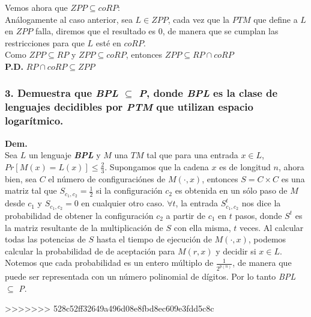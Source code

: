 \documentclass[12pt]{article}
\begin{document}
Vemos ahora que $ZPP \subseteq coRP$: \\
Análogamente al caso anterior, sea $L \in ZPP$, cada vez que la $PTM$ que define a $L$ en $ZPP$ falla, diremos que el resultado es 0, de manera que se cumplan las restricciones para que $L$ esté en $coRP$. \\

Como $ZPP \subseteq RP$ y $ZPP \subseteq coRP$, entonces $ZPP \subseteq RP \cap coRP$ \\

\fbox{\textbf{$\supseteq$}} \textbf{P.D.} $RP \cap coRP \subseteq ZPP$ \\



\subsubsection*{3. Demuestra que \textit{BPL} $\subseteq$ \textit{P}, donde \textit{BPL} es la clase de lenguajes decidibles por \textit{PTM} que utilizan espacio logarítmico.}
\textbf{Dem.}\\
Sea $L$ un lenguaje \textbf{\textit{BPL}} y $M$ una $TM$ tal que para una entrada $x \in L$, $Pr[M(x) = L(x)] \leq \frac{2}{3}$. Supongamos que la cadena $x$ es de longitud $n$, ahora bien, sea $C$ el número de configuraciónes de $M(\cdot,x)$, entonces $S = C \times C$ es una matriz tal que $S_{{c_1},{c_2}} = \frac{1}{2}$ si la configuración $c_2$ es obtenida en un sólo paso de $M$ desde $c_1$ y  $S_{{c_1},{c_2}} = 0$ en cualquier otro caso. $\forall t$, la entrada $S^t_{{c_1},{c_2}}$ nos dice la probabilidad de obtener
la configuración $c_2$ a partir de $c_1$ en $t$ pasos, donde $S^t$ es la matriz resultante de la multiplicación de $S$ con ella misma, $t$ veces. Al calcular todas las potencias de $S$ hasta el tiempo de ejecución de $M(\cdot,x)$, podemos calcular la probabilidad de de aceptación para $M(r,x)$ y decidir si $x \in L$. Notemos que cada probabilidad es un entero múltiplo de $\frac{1}{2^{p(n)}}$, de manera que puede ser representada con un número polinomial de dígitos. Por lo tanto \textit{BPL} $\subseteq$ \textit{P}.


>>>>>>> 528c52ff32649a496d08e8fbd8ec609e3fdd5c8c
\end{document}
